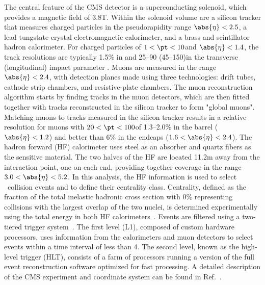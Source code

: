 \documentclass[11pt,twoside,a4paper,cmspaper]{cms-tdr}
\begin{document}
The central feature of the CMS detector is a superconducting solenoid, which provides a magnetic field of 3.8\unit{T}. Within the solenoid volume are a silicon tracker that measures charged particles in the pseudorapidity range $\abs{\eta} < 2.5$, a lead tungstate crystal electromagnetic calorimeter, and a brass and scintillator hadron calorimeter. For charged particles of $1 < \pt < 10$\GeVc and $\abs{\eta} < 1.4$, the track resolutions are typically 1.5\% in \pt and 25--90 (45--150)\mum in the transverse (longitudinal) impact parameter \cite{TRK-11-001}. Muons are measured in the range $\abs{\eta} < 2.4$, with detection planes made using three technologies: drift tubes, cathode strip chambers, and resistive-plate chambers. The muon reconstruction algorithm starts by finding tracks in the muon detectors, which are then fitted together with tracks reconstructed in the silicon tracker to form "global muons". Matching muons to tracks measured in the silicon tracker results in a relative \pt resolution for muons with $20 < \pt < 100$\GeVc of 1.3--2.0\% in the barrel ($\abs{\eta} < 1.2$) and better than 6\% in the endcaps ($1.6 < \abs{\eta} < 2.4$).
The hadron forward (HF) calorimeter uses steel as an absorber and quartz fibers as the sensitive material. The two halves of the HF are located 11.2\unit{m} away from the interaction point, one on each end, providing together coverage in the range $3.0 < \abs{\eta} < 5.2$. In this analysis, the HF information is used to select \PbPb\ collision events and to define their centrality class. Centrality, defined as the fraction of the total inelastic hadronic cross section with 0\% representing collisions with the largest overlap of the two nuclei, is determined experimentally using the total energy in both HF calorimeters~\cite{centralityref}. 
%
Events are filtered using a two-tiered trigger system~\cite{Khachatryan:2016bia}. 
The first level (L1), composed of custom hardware processors, uses information from the calorimeters and muon detectors to select events within a time interval of less than 4\mus. The second level, known as the high-level trigger (HLT), consists of a farm of processors running a version of the full event reconstruction software optimized for fast processing.
%
A detailed description of the CMS experiment and coordinate system can be found in Ref.~\cite{bib_CMS}.
\end{document}
